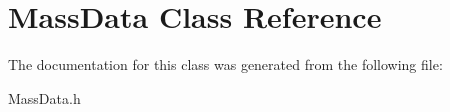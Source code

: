 \hypertarget{class_mass_data}{}\section{Mass\+Data Class Reference}
\label{class_mass_data}


The documentation for this class was generated from the following file\+:\begin{DoxyCompactItemize}
\item 
Mass\+Data.\+h\end{DoxyCompactItemize}
